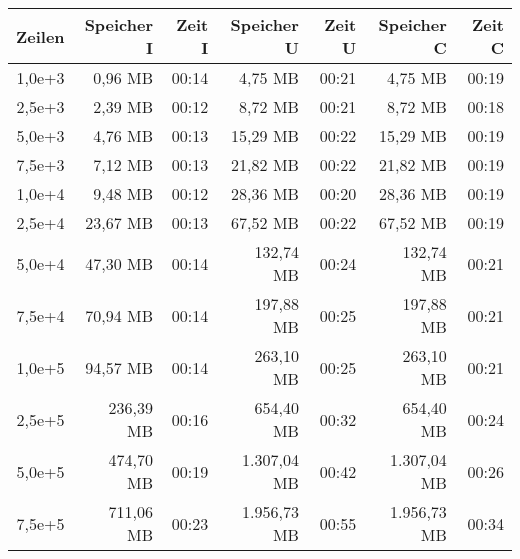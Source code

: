 \begin{table}
    \centering
    \begin{tabular}{|r|r|r|r|r|r|r|}
        \hline
        \textbf{Zeilen} & \textbf{Speicher I} & \textbf{Zeit I} & \textbf{Speicher U} & \textbf{Zeit U} & \textbf{Speicher C} & \textbf{Zeit C} \\ \hline
        1,0e+3          & 0,96 MB             & 00:14           & 4,75 MB             & 00:21           & 4,75 MB             & 00:19           \\ \hline
        2,5e+3          & 2,39 MB             & 00:12           & 8,72 MB             & 00:21           & 8,72 MB             & 00:18           \\ \hline
        5,0e+3          & 4,76 MB             & 00:13           & 15,29 MB            & 00:22           & 15,29 MB            & 00:19           \\ \hline
        7,5e+3          & 7,12 MB             & 00:13           & 21,82 MB            & 00:22           & 21,82 MB            & 00:19           \\ \hline
        1,0e+4          & 9,48 MB             & 00:12           & 28,36 MB            & 00:20           & 28,36 MB            & 00:19           \\ \hline
        2,5e+4          & 23,67 MB            & 00:13           & 67,52 MB            & 00:22           & 67,52 MB            & 00:19           \\ \hline
        5,0e+4          & 47,30 MB            & 00:14           & 132,74 MB           & 00:24           & 132,74 MB           & 00:21           \\ \hline
        7,5e+4          & 70,94 MB            & 00:14           & 197,88 MB           & 00:25           & 197,88 MB           & 00:21           \\ \hline
        1,0e+5          & 94,57 MB            & 00:14           & 263,10 MB           & 00:25           & 263,10 MB           & 00:21           \\ \hline
        2,5e+5          & 236,39 MB           & 00:16           & 654,40 MB           & 00:32           & 654,40 MB           & 00:24           \\ \hline
        5,0e+5          & 474,70 MB           & 00:19           & 1.307,04 MB         & 00:42           & 1.307,04 MB         & 00:26           \\ \hline
        7,5e+5          & 711,06 MB           & 00:23           & 1.956,73 MB         & 00:55           & 1.956,73 MB         & 00:34           \\ \hline

\end{tabular}
\end{table}
